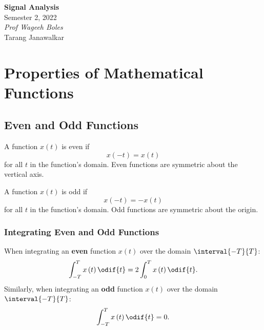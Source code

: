 \documentclass{article}
\date{}
\newcommand{\unitName}{Signal Analysis}
\newcommand{\unitTime}{Semester 2, 2022}
\newcommand{\unitCoordinator}{Prof Wageeh Boles}
\newcommand{\documentAuthors}{Tarang Janawalkar}
\begin{document}
%
\begin{titlepage}
    \vspace*{\fill}
    \begin{center}
        \LARGE{\textbf{\unitName}} \\[0.1in]
        \normalsize{\unitTime} \\[0.2in]
        \normalsize\textit{\unitCoordinator} \\[0.2in]
        \documentAuthors
    \end{center}
    \vspace*{\fill}
    \doclicenseThis
    \thispagestyle{empty}
\end{titlepage}
\newpage
%
\tableofcontents
\newpage
%
\section{Properties of Mathematical Functions}
\subsection{Even and Odd Functions}
\begin{definition}
    A function \(x\left( t \right)\) is even if
    \begin{equation*}
        x\left( -t \right) = x\left( t \right)
    \end{equation*}
    for all \(t\) in the function's domain. Even functions are symmetric about the vertical axis.
\end{definition}
\begin{definition}
    A function \(x\left( t \right)\) is odd if
    \begin{equation*}
        x\left( -t \right) = -x\left( t \right)
    \end{equation*}
    for all \(t\) in the function's domain. Odd functions are symmetric about the origin.
\end{definition}
\subsubsection{Integrating Even and Odd Functions}
When integrating an \textbf{even} function \(x\left( t \right)\) over
the domain \(\interval{-T}{T}\):
\begin{equation*}
    \int_{-T}^T x\left( t \right) \odif{t} = 2 \int_0^T x\left( t \right) \odif{t}.
\end{equation*}
Similarly, when integrating an \textbf{odd} function \(x\left( t \right)\) over the domain \(\interval{-T}{T}\):
\begin{equation*}
    \int_{-T}^T x\left( t \right) \odif{t} = 0.
\end{equation*}
\end{document}
